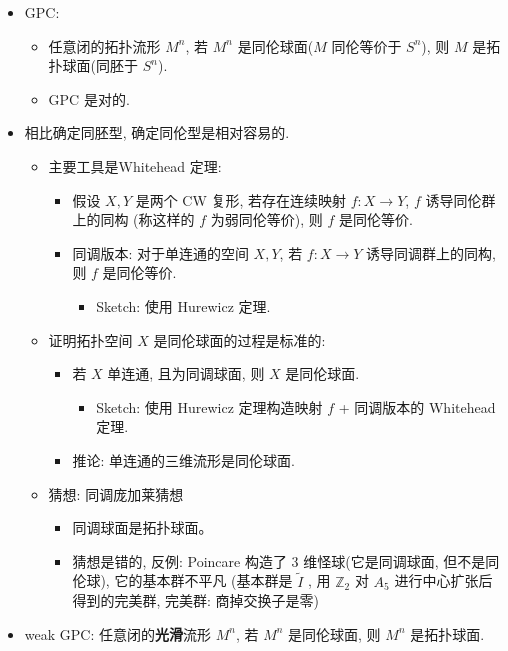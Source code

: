 \documentclass[
]{ctexart}
\providecommand{\tightlist}{%
  \setlength{\itemsep}{0pt}\setlength{\parskip}{0pt}}
\begin{document}
\begin{itemize}
\tightlist
\item
  GPC:

  \begin{itemize}
  \tightlist
  \item
    任意闭的拓扑流形 \(M^n\), 若 \(M^n\) 是同伦球面(\(M\) 同伦等价于
    \(S^n\)), 则 \(M\) 是拓扑球面(同胚于 \(S^n\)).
  \item
    GPC 是对的.
  \end{itemize}
\item
  相比确定同胚型, 确定同伦型是相对容易的.

  \begin{itemize}
  \tightlist
  \item
    主要工具是Whitehead 定理:

    \begin{itemize}
    \tightlist
    \item
      假设 \(X,Y\) 是两个 CW 复形, 若存在连续映射 \(f: X\to Y\), \(f\)
      诱导同伦群上的同构 (称这样的 \(f\) 为弱同伦等价), 则 \(f\)
      是同伦等价.
    \item
      同调版本: 对于单连通的空间 \(X,Y\), 若 \(f: X\to Y\)
      诱导同调群上的同构, 则 \(f\) 是同伦等价.

      \begin{itemize}
      \tightlist
      \item
        Sketch: 使用 Hurewicz 定理.
      \end{itemize}
    \end{itemize}
  \item
    证明拓扑空间 \(X\) 是同伦球面的过程是标准的:

    \begin{itemize}
    \tightlist
    \item
      若 \(X\) 单连通, 且为同调球面, 则 \(X\) 是同伦球面.

      \begin{itemize}
      \tightlist
      \item
        Sketch: 使用 Hurewicz 定理构造映射 \(f\) + 同调版本的 Whitehead
        定理.
      \end{itemize}
    \item
      推论: 单连通的三维流形是同伦球面.
    \end{itemize}
  \item
    猜想: 同调庞加莱猜想

    \begin{itemize}
    \tightlist
    \item
      同调球面是拓扑球面。
    \item
      猜想是错的, 反例: Poincare 构造了 3 维怪球(它是同调球面,
      但不是同伦球), 它的基本群不平凡 (基本群是 \(\tilde{I}\) , 用
      \(\mathbb{Z}_2\) 对 \(A_5\) 进行中心扩张后得到的完美群, 完美群:
      商掉交换子是零)
    \end{itemize}
  \end{itemize}
\item
  weak GPC: 任意闭的\textbf{光滑}流形 \(M^n\), 若 \(M^n\) 是同伦球面, 则
  \(M^n\) 是拓扑球面.


\end{itemize}
\end{document}
